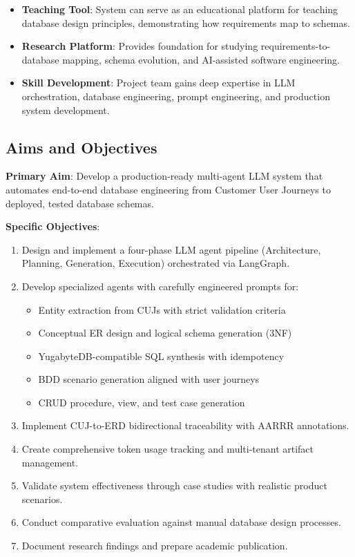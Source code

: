 \documentclass[12pt,a4paper]{article}
\begin{document}
\begin{itemize}
\item \textbf{Teaching Tool}: System can serve as an educational platform for teaching database design principles, demonstrating how requirements map to schemas.

\item \textbf{Research Platform}: Provides foundation for studying requirements-to-database mapping, schema evolution, and AI-assisted software engineering.

\item \textbf{Skill Development}: Project team gains deep expertise in LLM orchestration, database engineering, prompt engineering, and production system development.
\end{itemize}

\subsection{Aims and Objectives}

\textbf{Primary Aim}: Develop a production-ready multi-agent LLM system that automates end-to-end database engineering from Customer User Journeys to deployed, tested database schemas.

\textbf{Specific Objectives}:

\begin{enumerate}
\item Design and implement a four-phase LLM agent pipeline (Architecture, Planning, Generation, Execution) orchestrated via LangGraph.

\item Develop specialized agents with carefully engineered prompts for:
\begin{itemize}
\item Entity extraction from CUJs with strict validation criteria
\item Conceptual ER design and logical schema generation (3NF)
\item YugabyteDB-compatible SQL synthesis with idempotency
\item BDD scenario generation aligned with user journeys
\item CRUD procedure, view, and test case generation
\end{itemize}

\item Implement CUJ-to-ERD bidirectional traceability with AARRR annotations.

\item Create comprehensive token usage tracking and multi-tenant artifact management.

\item Validate system effectiveness through case studies with realistic product scenarios.

\item Conduct comparative evaluation against manual database design processes.

\item Document research findings and prepare academic publication.
\end{enumerate}
\end{document}
